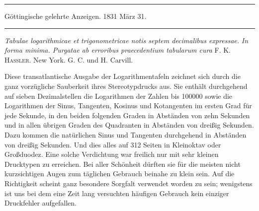 \par{}\begin{center}\rule{0.7\linewidth}{0.4pt}\par Göttingische gelehrte Anzeigen. 1831 März 31.\par\rule{0.7\linewidth}{0.4pt}\end{center}

\noindent\textit{Tabulae logarithmicae et trigonometricae notis septem decimalibus expressae.}
\textit{In forma minima. Purgatae ab erroribus praecedentium tabularum cura} F. K. \textsc{Hassler.} New York. G. C. und H. Carvill.

Diese transatlantische Ausgabe der Logarithmentafeln zeichnet sich durch die ganz vorzügliche Sauberkeit ihres Stereotypdrucks aus. Sie enthält durchgehend auf sieben Dezimalstellen die Logarithmen der Zahlen bis 100000 sowie die Logarithmen der Sinus, Tangenten, Kosinus und Kotangenten im ersten Grad für jede Sekunde, in den beiden folgenden Graden in Abständen von zehn Sekunden und in allen übrigen Graden des Quadranten in Abständen von dreißig Sekunden. Dazu kommen die natürlichen Sinus und Tangenten durchgehend in Abständen von dreißig Sekunden. Und dies alles auf 312 Seiten in Kleinoktav oder Großduodez. Eine solche Verdichtung war freilich nur mit sehr kleinen Drucktypen zu erreichen. Bei aller Schönheit dürften sie für die meisten nicht kurzsichtigen Augen zum täglichen Gebrauch beinahe zu klein sein. Auf die Richtigkeit scheint ganz besondere Sorgfalt verwendet worden zu sein; wenigstens ist uns bei dem eine Zeit lang versuchten häufigen Gebrauch kein einziger Druckfehler aufgefallen.

